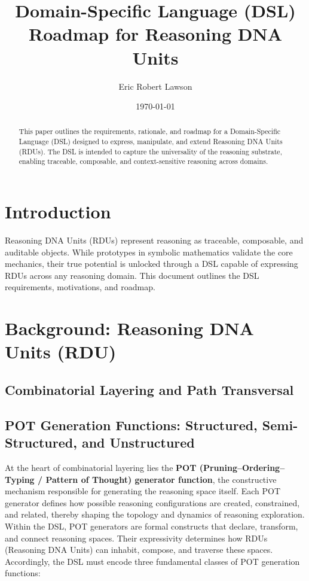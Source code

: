 \documentclass[11pt]{article}
\title{Domain-Specific Language (DSL) Roadmap for Reasoning DNA Units}
\author{Eric Robert Lawson}
\date{\today}
\begin{document}
\maketitle

\begin{abstract}
This paper outlines the requirements, rationale, and roadmap for a Domain-Specific Language (DSL) designed to express, manipulate, and extend Reasoning DNA Units (RDUs). The DSL is intended to capture the universality of the reasoning substrate, enabling traceable, composable, and context-sensitive reasoning across domains.
\end{abstract}

\tableofcontents

\section{Introduction}
Reasoning DNA Units (RDUs) represent reasoning as traceable, composable, and auditable objects. While prototypes in symbolic mathematics validate the core mechanics, their true potential is unlocked through a DSL capable of expressing RDUs across any reasoning domain. This document outlines the DSL requirements, motivations, and roadmap.

\section{Background: Reasoning DNA Units (RDU)}
\subsection{Combinatorial Layering and Path Transversal}
\subsection{POT Generation Functions: Structured, Semi-Structured, and Unstructured}

At the heart of combinatorial layering lies the \textbf{POT (Pruning–Ordering–Typing / Pattern of Thought) generator function}, the constructive mechanism responsible for generating the reasoning space itself. Each POT generator defines how possible reasoning configurations are created, constrained, and related, thereby shaping the topology and dynamics of reasoning exploration. Within the DSL, POT generators are formal constructs that declare, transform, and connect reasoning spaces. Their expressivity determines how RDUs (Reasoning DNA Units) can inhabit, compose, and traverse these spaces. Accordingly, the DSL must encode three fundamental classes of POT generation functions:
\end{document}
